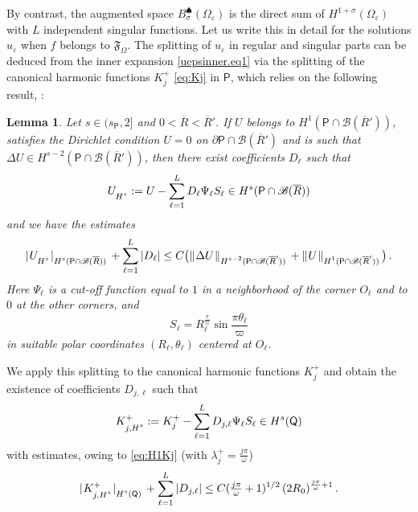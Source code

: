 \documentclass[titlepage,12pt]{amsart}
\newtheorem{lemma}[theorem]{Lemma}
\theoremstyle{definition}
\theoremstyle{remark}
\numberwithin{equation}{section}
\newcommand{\ee}{\hskip0.15ex}
\newcommand{\dd}[1]{_{\raise-0.6ex\hbox{$\scriptstyle #1$}}}
\newcommand {\Norm}[2]{ \mathchoice
    {|\ee #1\ee|\dd{#2}\,}
    {| #1 |_{#2}}
    {| #1 |_{#2}}
    {| #1 |_{#2}} }
\newcommand {\DNorm}[2]{ \mathchoice
    {\|\ee #1\ee\|\dd{#2}\,}
    {\| #1 \|_{#2}}
    {\| #1 \|_{#2}}
    {\| #1 \|_{#2}} }
\newcommand{\sB}{{\mathscr B}}
\newcommand{\rP}{{\mathsf{P}}}
\newcommand{\rQ}{{\mathsf{Q}}}
\newcommand {\gF}{\mathfrak{F}}
\newcommand{\oR}{\overline{R}}
\begin{document}
By contrast, the augmented space $B_\sigma^\spadesuit(\Omega_\varepsilon)$ is the direct sum of $H^{1+\sigma}(\Omega_\varepsilon)$ with $L$ independent singular functions.
Let us write this in detail for the solutions $u_\varepsilon$ when $f$ belongs to $\gF_\Omega$. 
The splitting of $u_\varepsilon$ in regular and singular parts can be deduced from the inner expansion \eqref{uepsinner.eq1} via the splitting of the canonical harmonic functions $K^+_j$ \eqref{eq:Kj} in $\rP$, which relies on the following result, \cite{Grisvard:1972,DBook:1988}:

\begin{lemma}
Let $s\in(s_\rP,2]$ and $0<\oR<\oR'$.
If $U$ belongs to $H^1(\rP\cap\sB(\oR'))$, satisfies the Dirichlet condition $U=0$ on $\partial\rP\cap\sB(\oR')$ and is such that $\Delta U\in H^{s-2}(\rP\cap\sB(\oR'))$, then there exist coefficients $D_\ell$ such that
\begin{equation}
\label{eq:singreg}
   U\dd{H^s}:=U - \sum_{\ell=1}^L D_\ell \Psi_\ell S_\ell \in H^s(\rP\cap\sB(\oR))
\end{equation}
and we have the estimates
\begin{equation}
\label{singregBRR'}
   \Norm{U\dd{H^s}}{H^{s}(\rP\cap\sB(\oR))} + \sum_{\ell=1}^L |D_\ell| \le 
   C\big( \DNorm{\Delta U}{H^{s-2}(\rP\cap\sB(\oR'))} 
   + \DNorm{U}{H^{1}(\rP\cap\sB(\oR'))} \big)\,.
\end{equation}
Here $\Psi_\ell$ is a cut-off function equal to $1$ in a neighborhood of the corner $O_\ell$ and to $0$ at the other corners, and 
\[
   S_\ell = R_\ell^{\frac{\pi}{\varpi}} \sin \frac{\pi\theta_\ell}{\varpi}
\]
in suitable polar coordinates $(R_\ell,\theta_\ell)$ centered at $O_\ell$. 
\end{lemma}


We apply this splitting to the canonical harmonic functions $K^+_j$ and obtain the existence of coefficients $D_{j,\ell}$ such that
\begin{equation}
\label{eq:KjHs}
   K^+\dd{j,H^s} := K^+_j - \sum_{\ell=1}^L D_{j,\ell} \Psi_\ell S_\ell \in H^s(\rQ)
\end{equation}
with estimates, owing to \eqref{eq:H1Kj} (with $\lambda^+_j=\frac{j\pi}{\omega}$)
\begin{equation}
\label{eq:Kjreg}
   \Norm{K^+\dd{j,H^s}}{H^{s}(\rQ)} + \sum_{\ell=1}^L |D_{j,\ell}| \le 
   C (\tfrac{j\pi}{\omega}+1)^{1/2}\, (2R_0)^{\frac{j\pi}{\omega}+1} \,.
\end{equation}
\end{document}
